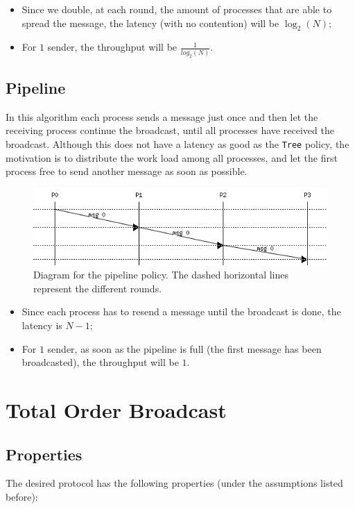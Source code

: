 \documentclass[a4paper, 11pt]{article}
\begin{document}
\begin{itemize}
	\item Since we double, at each round, the amount of processes that are able to spread the message, the latency (with no contention) will be $\log_2(N)$;
	\item For $1$ sender, the throughput will be $\frac{1}{log_2(N)}$.
\end{itemize}

\subsection{Pipeline}
	In this algorithm each process sends a message just once and then let the receiving process continue the broadcast, until all processes have received the broadcast. Although this does not have a latency as good as the \texttt{Tree} policy, the motivation is to distribute the work load among all processes, and let the first process free to send another message as soon as possible.
	
\begin{figure}[H]
	\centering
	\includegraphics[scale=0.9]{pipeline.PNG}
	\caption{Diagram for the pipeline policy. The dashed horizontal lines represent the different rounds.}
	\label{fig:diagramPipeline}
\end{figure}
	
\begin{itemize}
	\item Since each process has to resend a message until the broadcast is done, the latency is $N-1$;
	\item For $1$ sender, as soon as the pipeline is full (the first message has been broadcasted), the throughput  will be $1$.
\end{itemize}

\newpage
\section{Total Order Broadcast}
\subsection{Properties}
	The desired protocol has the following properties (under the assumptions listed before):
\end{document}
